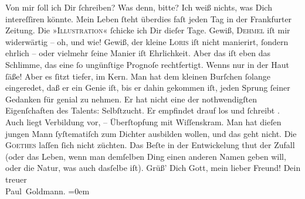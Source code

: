 \begin{ledgroupsized}[t]{13cm}
           \pstart
           Von mir ſoll ich Dir ſchreiben? Was denn, bitte? Ich weiß {\pb}nichts, was Dich intereſſiren könnte. Mein Leben
               ſteht überdies faſt jeden Tag in der Frankfurter
                  Zeitung.\pend
           \pstart
           Die »\textsc{Illustration}« ſchicke ich Dir dieſer Tage.\pend
           \pstart
           Gewiß, \textsc{Dehmel} iſt mir widerwärtig – oh, und wie!\pend
           \pstart
           Gewiß, der kleine \textsc{Loris} iſt nicht manierirt, {\pb}ſondern ehrlich – oder
               vielmehr ſeine Manier iſt Ehrlichkeit. Aber das iſt eben das Schlimme, das eine ſo
               ungünſtige  Prognoſe rechtfertigt. \strikeout{\textcolor{gray}{W}} Wenns nur in der Haut ſäße! Aber es ſitzt tiefer, im Kern. Man hat dem kleinen
                  Burſchen ſolange
               eingeredet, daß er ein Genie iſt, bis er dahin gekommen iſt, jeden Sprung ſeiner
               Gedanken für genial zu nehmen. {\pb}Er hat nicht eine
               der nothwendigſten Eigenſchaften des Talents: Selbſtzucht. Er empfindet drauf los und
               ſchreibt \label{K_L02776-15v}\label{K_L02776-15h}. Auch
               liegt Verbildung vor, – Überſtopfung mit Wiſſenskram. Man hat dieſen jungen Mann ſyſtematiſch zum Dichter
               ausbilden wollen, und das geht nicht. Die \textsc{Goethes} laſſen ſich nicht züchten. Das
               Beſte in der Entwickelung {\pb}thut der Zufall (oder das
               Leben, wenn man demſelben Ding einen anderen Namen geben will, oder die Natur, was
               auch dasſelbe iſt).\pend
           \pstart
           Grüß’ Dich Gott, mein lieber Freund!\pend
           \pstart
           Dein treuer {\\[\baselineskip]}\spacefill\mbox{Paul Goldmann.}\pend
           \leftskip=0em{}
         
         \endnumbering{}\end{ledgroupsized}  \newcommand{\dateiname}{L02776}\newcommand{\titel}{Paul Goldmann an Arthur Schnitzler, 4. 6. [1896]}\newcommand{\editorInnen}{Martin Anton Müller und Laura Untner}
      
